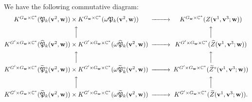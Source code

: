 \documentclass[12pt]{amsart}
\def\Bbb{\mathbb}
\def\frak{\mathfrak}
\renewcommand{\labelenumi}{(\theenumi)}%
\newenvironment{aenume}{%
  \begin{enumerate}%
  \renewcommand{\theenumi}{\alph{enumi}}%
  \renewcommand{\labelenumi}{(\theenumi)}%
  }{\end{enumerate}}
\theoremstyle{definition}
\theoremstyle{remark}
\numberwithin{equation}{subsection}
\newcommand{\C}{{\Bbb C}}
\newcommand{\bv}{{\mathbf v}} %
\newcommand{\bw}{{\mathbf w}} %
\newcommand{\Pa}{{\frak P}} %
\begin{document}
We have the following commutative diagram:
\begin{equation*}
\begin{CD}
{%
   K^{G_\bw\times\C^*}(\Pa_k(\bv^2,\bw))\times
   K^{G_\bw\times\C^*}(\omega \Pa_k(\bv^2,\bw))} @>>>
{%
   K^{G_\bw\times\C^*}(Z(\bv^1,\bv^3;\bw))} \\
      @AAA @AAA \\
{%
   K^{G'\times G_\bw\times\C^*}(\widehat\Pa_k(\bv^2,\bw))\times
   K^{G'\times G_\bw\times\C^*}(\omega\widehat\Pa_k(\bv^2,\bw))} @>>>
{%
   K^{G'\times G_\bw\times\C^*}(\widehat Z(\bv^1,\bv^3;\bw))} \\
      @AAA @AAA \\
{%
   K^{G'\times G_\bw\times\C^*}(\widetilde\Pa_k^\circ(\bv^2,\bw))\times
   K^{G'\times G_\bw\times\C^*}(\omega\widetilde\Pa_k^\circ(\bv^2,\bw))} @>>>
{%
   K^{G'\times G_\bw\times\C^*}(\widetilde Z^\circ(\bv^1,\bv^3;\bw))} \\
      @AAA @AAA \\
{%
   K^{G'\times G_\bw\times\C^*}(\widetilde\Pa_k(\bv^2,\bw))\times
   K^{G'\times G_\bw\times\C^*}(\omega\widetilde\Pa_k(\bv^2,\bw))} @>>>
{%
   K^{G'\times G_\bw\times\C^*}
   (\widetilde Z(\bv^1,\bv^3;\bw))}.
\end{CD}
\end{equation*}
\end{document}
